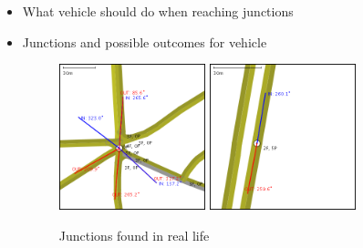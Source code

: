 \begin{itemize}
    \item What vehicle should do when reaching junctions
    \item Junctions and possible outcomes for vehicle
        \begin{figure}[!h]
            \caption{Junctions found in real life}
            \label{fig:junctionTypes}
            \centering
            \includegraphics[width=0.4\textwidth]{figs/junction/junction_5_roads.png}
            \hspace{0.2em}
            \includegraphics[width=0.4\textwidth]{figs/junction/junction_two_roads.png}
        \end{figure}


\end{itemize}
